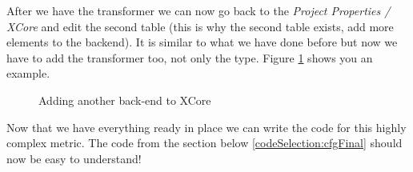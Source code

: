         After we have the transformer we can now go back to the \textit{Project Properties / XCore } and edit the second table (this is why the second table exists, add more elements to the backend). 
It is similar to what we have done before but now we have to add the transformer too, not only the type. Figure \ref{fig:multipleEntities} shows you an example.

       \begin{figure}[!htb]
             \centering
             \caption{Adding another back-end to XCore}
             \label{fig:multipleEntities}
        \end{figure}    

        Now that we have everything ready in place we can write the code for this highly complex metric. The code from the section below \ref{codeSelection:cfgFinal} should now be easy to understand!

